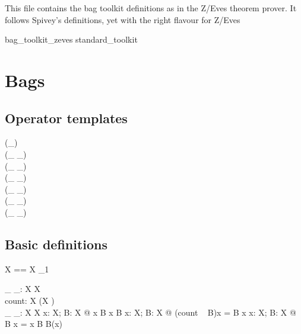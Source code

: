 \documentclass[draft,a4paper,10pt,wd]{article}
\begin{document}
This file contains the bag toolkit definitions as in the Z/Eves
theorem prover. It follows Spivey's definitions, yet with the
right flavour for Z/Eves

\begin{zsection}
\SECTION bag\_toolkit\_zeves \parents standard\_toolkit
\end{zsection}

\section{Bags }\label{def-bag}

\subsection*{Operator templates}

\begin{zed}
    \generic (\bag \_) \\
     \leftassoc (\_ \bcount \_) \\
     \leftassoc (\_ \otimes \_) \\
    \relation (\_ \inbag \_) \\
    \relation (\_ \subbageq \_) \\
     \leftassoc (\_ \uplus \_) \\
     \leftassoc (\_ \uminus \_)
\end{zed}

\subsection*{Basic definitions}

\begin{zed}
  \bag X == X \pfun \nat_1
\end{zed}

\begin{gendef}[X]
  \_ \inbag \_: X \rel \bag X \\
  count: \bag X \fun (X \fun \nat) \\
  \_ \bcount \_: \bag X \cross X \fun \nat
\where
  \forall x: X; B: \bag X @ x \inbag B \iff x \in \dom B
\also
  \forall x: X; B: \bag X @ (count ~ B)x = B \bcount x
\also
  \forall x: X; B: \bag X @ B \bcount x = 
    \IF x \inbag B \THEN B(x) 
\end{gendef}
\end{document}
